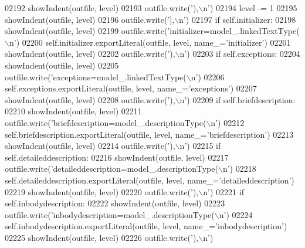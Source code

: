 \begin{DoxyCode}
{{{{{{{{{{{{{{{{{{{{{{{{{{{{{{{{{{{{{{{{{{{{{{{{{{{{{{{{{{{{{{{{{{{{{{{{{{{{{{{{{{{{{{{{{{{{{{{{{{{{{{{{{{{{{{{{{{{{{{{{{{{{{{{{{{{{{{{{{{{{{{{{{{{{{{{{{{{{{{{{{{{{{{{{{{02192             showIndent(outfile, level)
02193             outfile.write(\textcolor{stringliteral}{'),\(\backslash\)n'})
02194         level -= 1
02195         showIndent(outfile, level)
02196         outfile.write(\textcolor{stringliteral}{'],\(\backslash\)n'})
02197         \textcolor{keywordflow}{if} self.initializer:
02198             showIndent(outfile, level)
02199             outfile.write(\textcolor{stringliteral}{'initializer=model\_.linkedTextType(\(\backslash\)n'})
02200             self.initializer.exportLiteral(outfile, level, name\_=\textcolor{stringliteral}{'initializer'})
02201             showIndent(outfile, level)
02202             outfile.write(\textcolor{stringliteral}{'),\(\backslash\)n'})
02203         \textcolor{keywordflow}{if} self.exceptions:
02204             showIndent(outfile, level)
02205             outfile.write(\textcolor{stringliteral}{'exceptions=model\_.linkedTextType(\(\backslash\)n'})
02206             self.exceptions.exportLiteral(outfile, level, name\_=\textcolor{stringliteral}{'exceptions'})
02207             showIndent(outfile, level)
02208             outfile.write(\textcolor{stringliteral}{'),\(\backslash\)n'})
02209         \textcolor{keywordflow}{if} self.briefdescription:
02210             showIndent(outfile, level)
02211             outfile.write(\textcolor{stringliteral}{'briefdescription=model\_.descriptionType(\(\backslash\)n'})
02212             self.briefdescription.exportLiteral(outfile, level, name\_=\textcolor{stringliteral}{'briefdescription'})
02213             showIndent(outfile, level)
02214             outfile.write(\textcolor{stringliteral}{'),\(\backslash\)n'})
02215         \textcolor{keywordflow}{if} self.detaileddescription:
02216             showIndent(outfile, level)
02217             outfile.write(\textcolor{stringliteral}{'detaileddescription=model\_.descriptionType(\(\backslash\)n'})
02218             self.detaileddescription.exportLiteral(outfile, level, name\_=\textcolor{stringliteral}{'detaileddescription'})
02219             showIndent(outfile, level)
02220             outfile.write(\textcolor{stringliteral}{'),\(\backslash\)n'})
02221         \textcolor{keywordflow}{if} self.inbodydescription:
02222             showIndent(outfile, level)
02223             outfile.write(\textcolor{stringliteral}{'inbodydescription=model\_.descriptionType(\(\backslash\)n'})
02224             self.inbodydescription.exportLiteral(outfile, level, name\_=\textcolor{stringliteral}{'inbodydescription'})
02225             showIndent(outfile, level)
02226             outfile.write(\textcolor{stringliteral}{'),\(\backslash\)n'})
}}}}}}}}}}}}}}}}}}}}}}}}}}}}}}}}}}}}}}}}}}}}}}}}}}}}}}}}}}}}}}}}}}}}}}}}}}}}}}}}}}}}}}}}}}}}}}}}}}}}}}}}}}}}}}}}}}}}}}}}}}}}}}}}}}}}}}}}}}}}}}}}}}}}}}}}}}}}}}}}}}}}}}}}}}
\end{DoxyCode}
